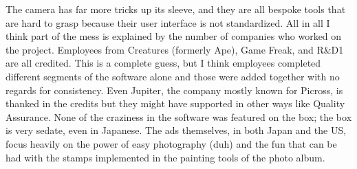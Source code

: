 \documentclass{book}
\let\oldcenter\center
\let\oldendcenter\endcenter
\renewenvironment{center}{\setlength\topsep{0pt}\oldcenter}{\oldendcenter}
\begin{document}
\begin{center}
\quad\vspace{4pt}
\quad\vspace{4pt}
\quad\vspace{4pt}
\quad\vspace{4pt}
\quad\vspace{4pt}
\quad\vspace{4pt}
\end{center}

The camera has far more tricks up its sleeve, and they are all bespoke tools that are hard to grasp because their user interface is not standardized. All in all I think part of the mess is explained by the number of companies who worked on the project. Employees from Creatures (formerly Ape), Game Freak, and R\&D1 are all credited. This is a complete guess, but I think employees completed different segments of the software alone and those were added together with no regards for consistency. Even Jupiter, the company mostly known for Picross, is thanked in the credits but they might have supported in other ways like Quality Assurance. None of the craziness in the software was featured on the box; the box is very sedate, even in Japanese. The ads themselves, in both Japan and the US, focus heavily on the power of easy photography (duh) and the fun that can be had with the stamps implemented in the painting tools of the photo album.

\begin{center}
\quad\vspace{4pt}
\quad\vspace{4pt}
\end{center}
\end{document}
